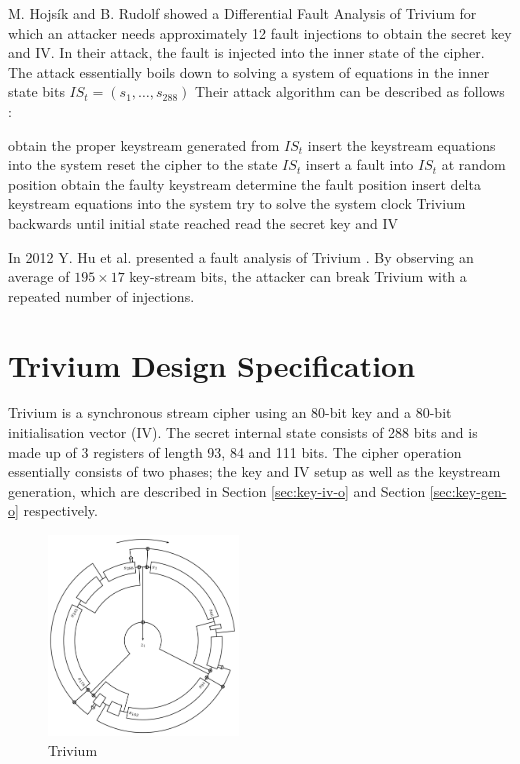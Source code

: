 \documentclass[conference]{IEEEtran}
\begin{document}
M. Hojsík and B. Rudolf \cite{Hojsik2008} showed a Differential Fault Analysis of Trivium for which an attacker needs approximately 12 fault injections to obtain the secret key and IV. In their attack, the fault is injected into the inner state of the cipher. 
The attack essentially boils down to solving a system of equations in the inner state bits $IS_t = (s_1,\dots, s_{288})$
Their attack algorithm can be described as follows \cite{Hojsik2008}:
\begin{algorithmic}[1]
\State obtain the proper keystream generated from $IS_t$ 
\State insert the keystream equations into the system 
\State reset the cipher to the state $IS_t$
\State insert a fault into $IS_t$ at random position
\State obtain the faulty keystream
\State determine the fault position
\State insert delta keystream equations into the system
\State try to solve the system
\EndWhile
\State clock Trivium backwards until initial state reached
\State read the secret key and IV
\end{algorithmic}

In 2012 Y. Hu et al. presented a fault analysis of Trivium \cite{Hu2012}. By observing an average of $195 \times 17$ key-stream bits, the attacker can break Trivium with a repeated number of injections. 

\section{Trivium Design Specification}

Trivium is a synchronous stream cipher using an 80-bit key and a 80-bit initialisation vector (IV). The secret internal state consists of 288 bits and is made up of 3 registers of length 93, 84 and 111 bits. The cipher operation essentially consists of two phases; the key and IV setup as well as the keystream generation, which are described in Section \ref{sec:key-iv-o} and Section \ref{sec:key-gen-o} respectively.

\begin{figure}[H]
\centering
\includegraphics[width=0.45\textwidth]{figures/round.png}
\caption{Trivium \cite{circle}}
\label{fig:circle}
\end{figure}
\end{document}

